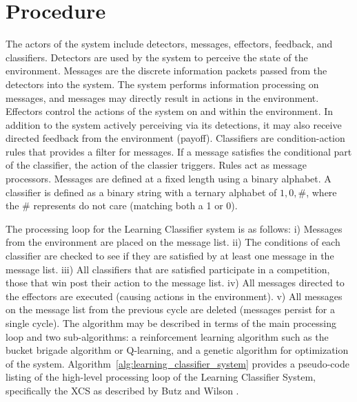 \documentclass[a4paper, 11pt]{article}
\begin{document}
\section{Procedure}
\label{sec:procedure}
The actors of the system include detectors, messages, effectors, feedback, and classifiers. Detectors are used by the system to perceive the state of the environment. Messages are the discrete information packets passed from the detectors into the system. The system performs information processing on messages, and messages may directly result in actions in the environment. Effectors control the actions of the system on and within the environment. In addition to the system actively perceiving via its detections, it may also receive directed feedback from the environment (payoff). Classifiers are condition-action rules that provides a filter for messages. If a message satisfies the conditional part of the classifier, the action of the classier triggers. Rules act as message processors.
Messages are defined at a fixed length using a binary alphabet. A classifier is defined as a binary string with a ternary alphabet of ${1, 0, \#}$, where the $\#$ represents do not care (matching both a 1 or 0). 

The processing loop for the Learning Classifier system is as follows: i) Messages from the environment are placed on the message list. ii) The conditions of each classifier are checked to see if they are satisfied by at least one message in the message list. iii) All classifiers that are satisfied participate in a competition, those that win post their action to the message list. iv) All messages directed to the effectors are executed (causing actions in the environment). v) All messages on the message list from the previous cycle are deleted (messages persist for a single cycle).
The algorithm may be described in terms of the main processing loop and two sub-algorithms: a reinforcement learning algorithm such as the bucket brigade algorithm or Q-learning, and a genetic algorithm for optimization of the system.
Algorithm~\ref{alg:learning_classifier_system} provides a pseudo-code listing of the high-level processing loop of the Learning Classifier System, specifically the XCS as described by Butz and Wilson \cite{Butz2002a}. 
\end{document}
